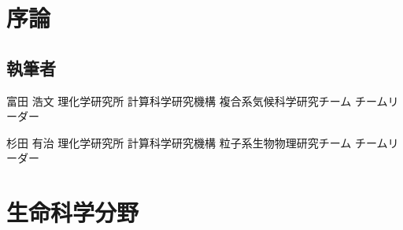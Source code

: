 %
%   
\begin{執筆者一覧}
\section{序論}
\subsection{執筆者}
\item
{富田 浩文}
{理化学研究所 計算科学研究機構 複合系気候科学研究チーム}
{チームリーダー}
\item
{杉田 有治}
{理化学研究所 計算科学研究機構 粒子系生物物理研究チーム}
{チームリーダー}
\section{生命科学分野}

\end{執筆者一覧}
